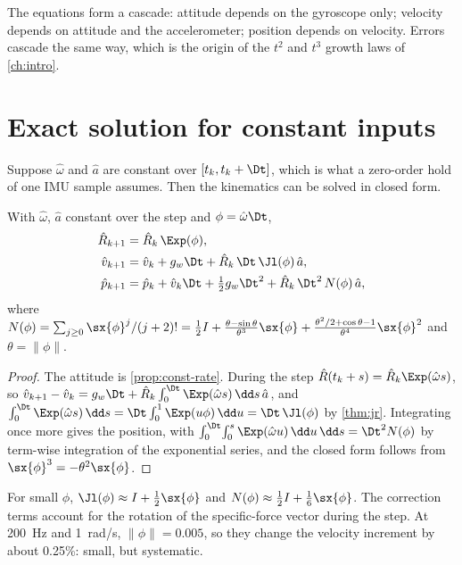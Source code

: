 The equations form a cascade: attitude depends on the gyroscope only; velocity depends on attitude and the
accelerometer; position depends on velocity. Errors cascade the same way, which is the origin of the
$t^2$ and $t^3$ growth laws of \cref{ch:intro}.

\section{Exact solution for constant inputs}

Suppose $\hat\omega$ and $\hat a$ are constant over $[t_k, t_k + \Dt]$, which is what a zero-order hold of one
IMU sample assumes. Then the kinematics can be solved in closed form.

\begin{proposition}
\label{prop:exact-prop}
With $\hat\omega$, $\hat a$ constant over the step and $\phi = \hat\omega\Dt$,
\begin{align}
  \hat R_{k+1} &= \hat R_k\,\Exp(\phi), \\
  \hat v_{k+1} &= \hat v_k + g_w\Dt + \hat R_k\,\Dt\,\Jl(\phi)\,\hat a, \\
  \hat p_{k+1} &= \hat p_k + \hat v_k\Dt + \tfrac12 g_w\Dt^2 + \hat R_k\,\Dt^2\,N(\phi)\,\hat a,
\end{align}
where $N(\phi) = \sum_{j\ge0}\sx{\phi}^j/(j+2)! = \tfrac12 I + \frac{\theta - \sin\theta}{\theta^3}\sx{\phi} +
\frac{\theta^2/2 + \cos\theta - 1}{\theta^4}\sx{\phi}^2$ and $\theta = \|\phi\|$.
\end{proposition}
\begin{proof}
The attitude is \cref{prop:const-rate}. During the step $\hat R(t_k + s) = \hat R_k\Exp(\hat\omega s)$, so
$\hat v_{k+1} - \hat v_k = g_w\Dt + \hat R_k\int_0^\Dt\Exp(\hat\omega s)\,\dd s\,\hat a$, and
$\int_0^\Dt\Exp(\hat\omega s)\,\dd s = \Dt\int_0^1\Exp(u\phi)\,\dd u = \Dt\,\Jl(\phi)$ by \cref{thm:jr}. Integrating once more
gives the position, with $\int_0^\Dt\!\int_0^s\Exp(\hat\omega u)\,\dd u\,\dd s = \Dt^2N(\phi)$ by term-wise integration of
the exponential series, and the closed form follows from $\sx{\phi}^3 = -\theta^2\sx{\phi}$.
\end{proof}

For small $\phi$, $\Jl(\phi) \approx I + \tfrac12\sx{\phi}$ and $N(\phi) \approx \tfrac12 I + \tfrac16\sx{\phi}$. The
correction terms account for the rotation of the specific-force vector during the step. At 200~Hz and
1~rad/s, $\|\phi\| = 0.005$, so they change the velocity increment by about 0.25\%: small, but systematic.

